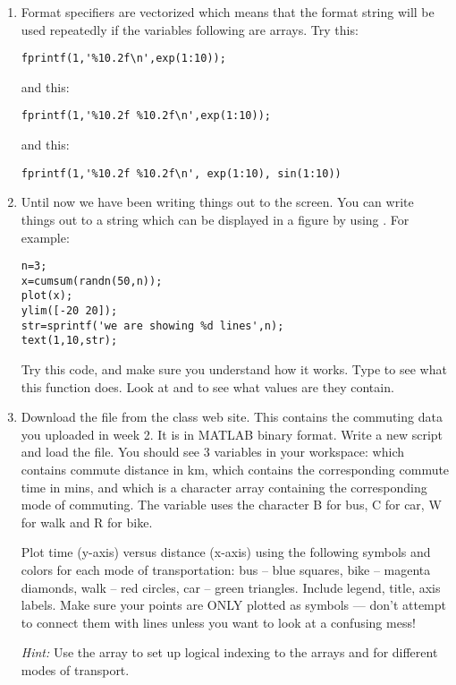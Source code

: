 \documentclass[letterpaper]{article}
\begin{document}
\begin{enumerate}
\item Format specifiers are vectorized which means that the format string will be used repeatedly
if the variables following are arrays. Try this:
\begin{lstlisting}
fprintf(1,'%10.2f\n',exp(1:10));
\end{lstlisting}
and this:
\begin{lstlisting}
fprintf(1,'%10.2f %10.2f\n',exp(1:10));
\end{lstlisting}
and this:
\begin{lstlisting}
fprintf(1,'%10.2f %10.2f\n', exp(1:10), sin(1:10))
\end{lstlisting}

\item Until now we have been writing things out to the screen. You can write things out to
a string which can be displayed in a figure by using . For example:
\begin{lstlisting}
n=3;
x=cumsum(randn(50,n));
plot(x);
ylim([-20 20]);
str=sprintf('we are showing %d lines',n);
text(1,10,str);
\end{lstlisting}

Try this code, and make sure you understand how it works. Type  to see what this function does.
Look at
 and  to see what values are they contain.

\item Download the file  from the class web site.  This contains the commuting data you uploaded in week 2.  It is in MATLAB binary format.   Write a new script  and load the file.
You should see 3 variables in your workspace:  which contains commute distance in km,  which contains the corresponding commute time in mins, and  which is a character array containing the corresponding mode of commuting.  The variable  uses the character B for bus, C for car, W for walk and R for bike.

Plot time (y-axis) versus distance (x-axis) using the following symbols and colors for each mode
of transportation:  bus -- blue squares, bike -- magenta diamonds, walk -- red circles, car -- green triangles.     Include legend, title, axis labels.  Make sure your points are ONLY plotted as symbols --- don't attempt to connect them with lines unless you want to look at a confusing mess!

{\it Hint:} Use the array  to set up logical indexing to the arrays  and  for different modes of transport. 


\end{enumerate}
\end{document}
